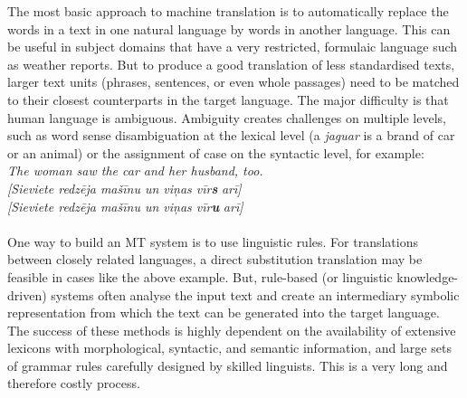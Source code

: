 \begin{multicols}{2}
The most basic approach to machine translation is to automatically replace the words in a text in one natural language by words in another language.
This can be useful in subject domains that have a very restricted, formulaic language such as weather reports.
But to produce a good translation of less standardised texts, larger text units (phrases, sentences, or even whole passages) need to be matched to their closest counterparts in the target language.
The major difficulty is that human language is ambiguous.
Ambiguity creates challenges on multiple levels, such as word sense disambiguation at the lexical level (a \textit{jaguar} is a brand of car or an animal) or the assignment of case on the syntactic level, for example:
\\
\textit{The woman saw the car and her husband, too.}\\
\textit{[Sieviete redzēja mašīnu un viņas vīr}\textbf{\textit{s}}\textit{ arī]}\\
\textit{[Sieviete redzēja mašīnu un viņas vīr}\textbf{\textit{u}}\textit{ arī]}\\
\\
One way to build an MT system is to use linguistic rules.
For translations between closely related languages, a direct substitution translation may be feasible in cases like the above example.
But, rule-based (or linguistic knowledge-driven) systems often analyse the input text and create an intermediary symbolic representation from which the text can be generated into the target language.
The success of these methods is highly dependent on the availability of extensive lexicons with morphological, syntactic, and semantic information, and large sets of grammar rules carefully designed by skilled linguists.
This is a very long and therefore costly process.


\end{multicols}
